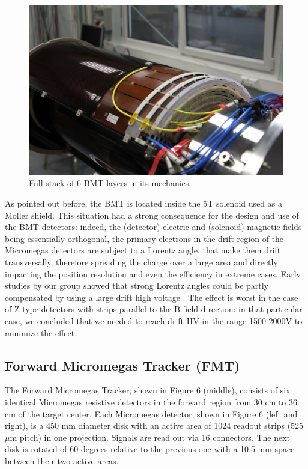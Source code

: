 \begin{figure}[htb]
 \includegraphics[width=1.0\columnwidth,keepaspectratio]{images/fig5}
 \caption{Full stack of 6 BMT layers in its mechanics.}
 \label{fig:mm-fig5}
\end{figure}

As pointed out before, the BMT is located inside the 5T solenoid used as a Moller shield. This situation had a strong 
consequence for the design and use of the BMT detectors: indeed, the (detector) electric and (solenoid) magnetic fields 
being essentially orthogonal, the primary electrons in the drift region of the Micromegas detectors are subject to a 
Lorentz angle, that make them drift transversally, therefore spreading the charge over a large area and directly 
impacting the position resolution and even the efficiency in extreme cases. Early studies by our group showed that 
strong Lorentz angles could be partly compensated by using a large drift high voltage \cite{KONCZYKOWSKI2010274}. The 
effect is worst in the case of Z-type detectors with strips parallel to the B-field direction: in that particular case, 
we concluded that we needed to reach drift HV in the range 1500-2000V to minimize the effect.

\subsection{Forward Micromegas Tracker (FMT)}

The Forward Micromegas Tracker, shown in Figure 6 (middle), consists of six identical Micromegas resistive detectors in 
the forward region from 30 cm to 36 cm of the target center. Each Micromegas detector, shown in Figure 6 (left and 
right), is a 450 mm diameter disk with an active area of 1024 readout strips (525 $\mu$m pitch) in one projection. 
Signals are read out via 16 connectors. The next disk is rotated of 60 degrees relative to the previous one with a 10.5 
mm space between their two active areas. 

